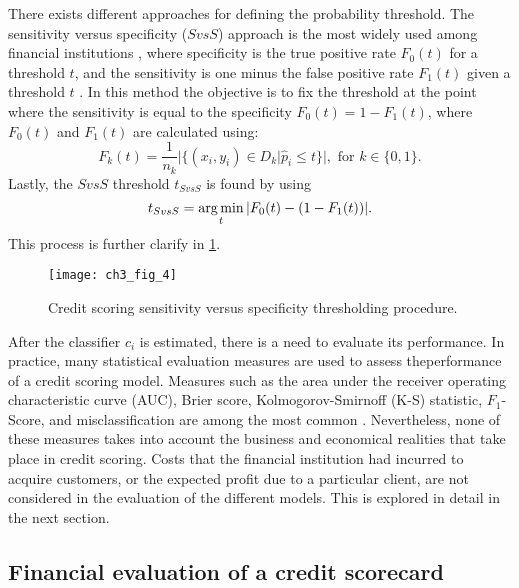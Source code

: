   There exists different approaches for defining the probability threshold. The sensitivity versus 
  specificity ($SvsS$) approach is the most widely used among financial institutions 
  \citep{Anderson2007}, where specificity is the true positive rate $F_0(t)$ for a threshold $t$, 
  and the sensitivity is one minus the false positive rate $F_1(t)$ given a threshold $t$ 
  \citep{Hernandez-Orallo2012}. In this method the objective is to fix the threshold at the point 
  where the sensitivity is equal to the specificity $F_0(t)=1-F_1(t)$, where $F_0(t)$ and $F_1(t)$ 
  are calculated using:
  \begin{equation}
   F_k(t)=\frac{1}{n_k}\vert \{ ( x_i,y_i ) \in D_k \vert \hat p_i \le t \}\vert, \text{ for } 
   k\in\{0,1\}.
  \end{equation}
  Lastly, the $SvsS$ threshold $t_{SvsS}$ is found by using
  \begin{equation}
  t_{SvsS}= \operatorname*{arg\,min}_t \vert F_0(t) - (1-F_1(t)) \vert.
  \end{equation}
  This process is further clarify in \figurename{ \ref{fig:ch3:4}}.
  
  \begin{figure}
  \centering
  \centering
  \texttt{[image: ch3\_fig\_4]}
  \caption{Credit scoring sensitivity versus specificity thresholding procedure.}
  \label{fig:ch3:4}
  \end{figure}
  
  After the classifier $c_i$ is estimated, there is a need to evaluate its performance. In 
  practice, many statistical evaluation measures are used to assess theperformance of a credit 
  scoring model. Measures such as the area under the  receiver operating characteristic curve (AUC),
  Brier score, Kolmogorov-Smirnoff (K-S) statistic,  $F_1$-Score, and misclassification are among 
  the most common \citep{Beling2005}. Nevertheless, none of these measures takes into account the 
  business and economical realities that take place in credit scoring. Costs that the financial 
  institution had incurred to acquire customers, or the expected profit due to a particular client, 
  are not considered in the evaluation of the different models. This is explored in detail in the 
  next section.

  
  \subsection{Financial evaluation of a credit scorecard }
  
